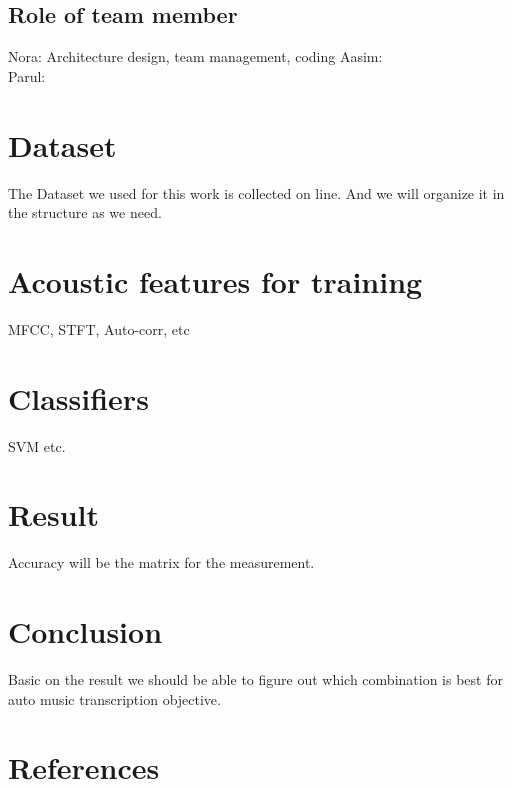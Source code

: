 \documentclass{article}
\begin{document}
\subsection{Role of team member}\label{subsec:Role of team member}
Nora: Architecture design, team management, coding
Aasim:\\
Parul:\\
 
%
\section{Dataset}\label{sec:Dataset}
The Dataset we used for this work is collected on line. And we will organize it in the structure as we need.

\section{Acoustic features for training}\label{sec:features}
MFCC, STFT, Auto-corr, etc

\section{Classifiers}\label{sec:Classifiers}
SVM etc.


\section{Result}\label{sec:Result}
Accuracy will be the matrix for the measurement.

\section{Conclusion}\label{sec:Conclusion}
Basic on the result we should be able to figure out which combination is best for auto music transcription objective.



\section{References}




%
%
%
%
\end{document}
